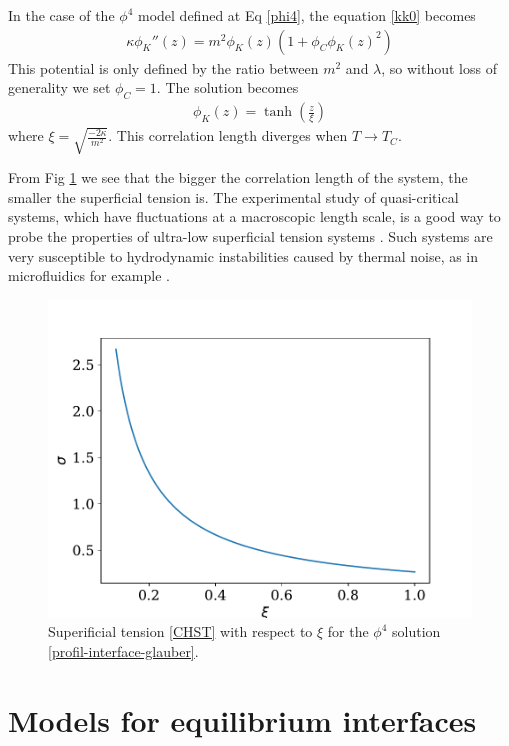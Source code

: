 {\color{blue}In the case of the $\phi^4$ model defined at Eq \eqref{phi4}, the equation \eqref{kk0} becomes
\begin{align}
    \kappa \phi_K''(z) = m^2 \phi_K(z) \left( 1 + \phi_C \phi_K(z) ^2 \right)
       \label{eq-interface-glauber}
\end{align}
This potential is only defined by the ratio between $m^2$ and $\lambda$, so without loss of generality we set $\phi_C = 1$. The solution becomes
\begin{align}
    \phi_K(z) = \tanh \left( \frac{z}{\xi} \right)
       \label{profil-interface-glauber}    
\end{align}
where $\xi = \sqrt{\frac{-2 \kappa}{m^2}}$. This correlation length diverges when $T\to T_C$.}
{\color{purple}From Fig \ref{tension-xi} we see that the bigger the correlation length of the system, the smaller the superficial tension is. The experimental study of quasi-critical systems, which have fluctuations at a macroscopic length scale, is a good way to probe the properties of ultra-low superficial tension systems \cite{hennequin_drop_2006}. Such systems are very susceptible to hydrodynamic instabilities caused by thermal noise, as in microfluidics for example \cite{atencia_controlled_2005}. 
\begin{figure}
    \centering
    \includegraphics[width=0.7\linewidth]{int-dyn/tension-superficielle.pdf}
    \caption{Superificial tension \eqref{CHST} with respect to $\xi$ for the $\phi^4$ solution \eqref{profil-interface-glauber}.}
    \label{tension-xi}
\end{figure}
}

\section{Models for equilibrium interfaces}

